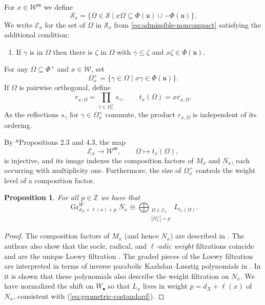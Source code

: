 \documentclass[12pt]{amsart}
\newtheorem{prop}[theorem]{Proposition}
\theoremstyle{definition}
\numberwithin{equation}{section}
\newcommand{\m}{\mathfrak m}
\newcommand{\W}{\mathscr W}
\begin{document}
For $x\in \W^{\m}$ we define
\begin{equation}\label{eq:admissible-noncompact}
\mathscr{S}_x=\{ \Omega \in \mathscr{S} \mid x\Omega \subseteq \Phi(\mathfrak{u})\cup -\Phi(\mathfrak{u})\}.
\end{equation}
We write $\mathscr{E}_x$ for the set of $\Omega$ in
$\mathscr{S}_x$ from \eqref{eq:admissible-noncompact}
satisfying the additional condition:
\begin{enumerate}
\item [(c)] If $\gamma$ is in $\Omega$ then there is $\zeta$ in $\Omega$ with $\gamma \leq \zeta$ and $x\zeta \in \Phi(\mathfrak{u})$.   
\end{enumerate}
For any $\Omega\subseteq\Phi^+$ and $x\in\W$, set
\begin{equation}\label{eq:admissible-positive}
\Omega_x^+
=
\{\gamma\in\Omega\mid x\gamma\in\Phi(\mathfrak{u})\}.
\end{equation}
If $\Omega$ is pairwise orthogonal, define
\begin{equation}\label{eq:admissible-label}
r_{x,\Omega}
=
\prod_{\gamma\in\Omega_x^+}s_\gamma,
\qquad
t_x(\Omega)=\overline{x r_{x,\Omega}}.
\end{equation}
As the reflections $s_{\gamma}$ for $\gamma\in \Omega_x^+$ commute, the product $r_{x,\Omega}$ is independent of its
ordering.

By \cite{intertwining}*{Propositions 2.3 and 4.3}, the map
\begin{equation}\label{eq:admissible-factors}
\mathscr E_x\longrightarrow\W^{\m},
\qquad
\Omega\longmapsto t_x(\Omega),
\end{equation}
is injective, and its image indexes the composition factors of
$M_x$ and $N_x$, each occurring with multiplicity one. Furthermore, the size of $\Omega_x^+$ controls the weight level of a composition factor.

\begin{prop}\label{prop:am-weight-normalization}
For all $p\in \mathbb{Z}$ we have that 
\begin{equation}\label{eq:am-weight-layers}
\operatorname{Gr}^{W}_{d_X+\ell(x)+p}N_x
\cong
\bigoplus_{\substack{\Omega\in\mathscr E_x\\
                    |\Omega_x^+|=p}}
L_{t_x(\Omega)}.    
\end{equation}
\end{prop}
\begin{proof}
The composition factors of $M_x$ (and hence $N_x$) are described in \cite[Theorem 1.3]{cisWeight}. The authors also show that the socle, radical, and \textit{$\ell$-adic weight} filtrations coincide and are the unique Loewy filtration \cite[Corollary 1.7]{cisWeight}.  The graded pieces of the Loewy filtration are interpreted in terms of inverse parabolic Kazhdan--Lusztig polynomials in \cite[Corollary 7.1.3]{irvingBook}.  In \cite[Theorem 1.4]{KT} it is shown that these polynomials also describe the weight filtration on $N_x$. We have normalized the shift on $W_{\bullet}$ so that $L_x$ lives in weight $p=d_X+\ell(x)$ of $N_x$, consistent with (\ref{eq:geometric-costandard}).
\end{proof}
\end{document}
